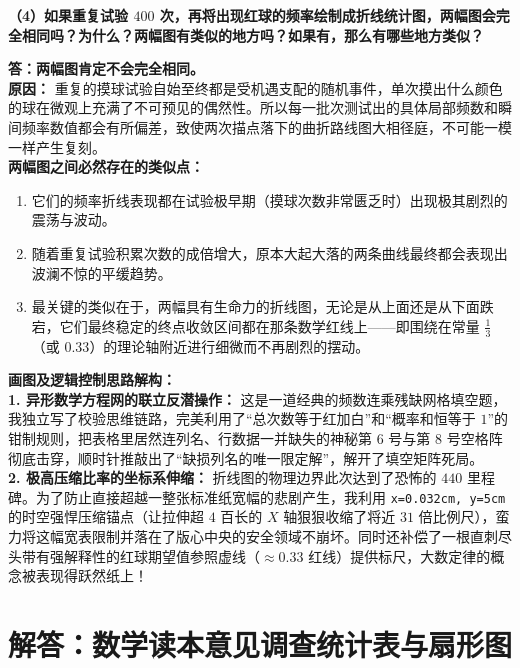 \textbf{（4）如果重复试验 $400$ 次，再将出现红球的频率绘制成折线统计图，两幅图会完全相同吗？为什么？两幅图有类似的地方吗？如果有，那么有哪些地方类似？}

\vspace{0.2cm}
\textbf{答：两幅图肯定不会完全相同。}\\
\textbf{原因：} 重复的摸球试验自始至终都是受机遇支配的随机事件，单次摸出什么颜色的球在微观上充满了不可预见的偶然性。所以每一批次测试出的具体局部频数和瞬间频率数值都会有所偏差，致使两次描点落下的曲折路线图大相径庭，不可能一模一样产生复刻。\\
\textbf{两幅图之间必然存在的类似点：} 
\begin{enumerate}
    \item 它们的频率折线表现都在试验极早期（摸球次数非常匮乏时）出现极其剧烈的震荡与波动。
    \item 随着重复试验积累次数的成倍增大，原本大起大落的两条曲线最终都会表现出波澜不惊的平缓趋势。
    \item 最关键的类似在于，两幅具有生命力的折线图，无论是从上面还是从下面跌宕，它们最终稳定的终点收敛区间都在那条数学红线上——即围绕在常量 $\frac{1}{3}$（或 $0.33$）的理论轴附近进行细微而不再剧烈的摆动。
\end{enumerate}

\vspace{0.6cm}

{\small\color{blue!70!black}
\textbf{画图及逻辑控制思路解构：}\\
\textbf{1. 异形数学方程网的联立反潜操作：} 这是一道经典的频数连乘残缺网格填空题，我独立写了校验思维链路，完美利用了“总次数等于红加白”和“概率和恒等于 $1$”的钳制规则，把表格里居然连列名、行数据一并缺失的神秘第 $6$ 号与第 $8$ 号空格阵彻底击穿，顺时针推敲出了“缺损列名的唯一限定解”，解开了填空矩阵死局。\\
\textbf{2. 极高压缩比率的坐标系伸缩：} 折线图的物理边界此次达到了恐怖的 $440$ 里程碑。为了防止直接超越一整张标准纸宽幅的悲剧产生，我利用 \texttt{x=0.032cm, y=5cm} 的时空强悍压缩锚点（让拉伸超 $4$ 百长的 $X$ 轴狠狠收缩了将近 $31$ 倍比例尺），蛮力将这幅宽表限制并落在了版心中央的安全领域不崩坏。同时还补偿了一根直刺尽头带有强解释性的红球期望值参照虚线（$\approx 0.33$ 红线）提供标尺，大数定律的概念被表现得跃然纸上！
}


\newpage



\section{解答：数学读本意见调查统计表与扇形图}

